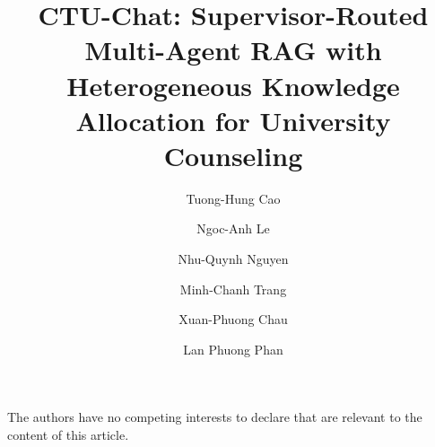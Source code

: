 \documentclass[runningheads]{llncs}
\begin{document}
\title{CTU-Chat: Supervisor-Routed Multi-Agent RAG with Heterogeneous Knowledge Allocation for University Counseling}

\author{Tuong-Hung Cao \and
Ngoc-Anh Le \and
Nhu-Quynh Nguyen \and
Minh-Chanh Trang \and
Xuan-Phuong Chau\and
Lan Phuong Phan}

\maketitle










\begin{credits}
\subsubsection{\discintname}
The authors have no competing interests to declare that are relevant to the content of this article.
\end{credits}



\end{document}
